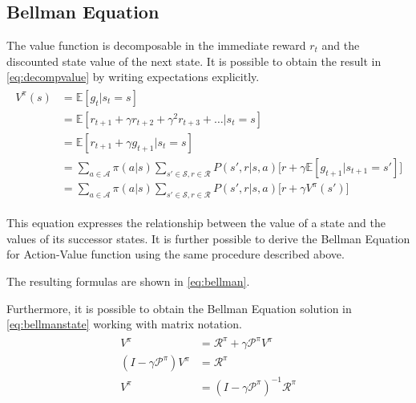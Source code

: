 \appendix

\chapter{}
\section{Bellman Equation} \label{appendix:bellmaneq}


The value function is decomposable in the immediate reward $r_t$ and the discounted state value of the next state. It is possible to obtain the result in \vref{eq:decompvalue} by writing expectations explicitly.
\begin{align}\label{eq:decompvalue}
\begin{split}
V^\pi(s) &= \mathbb{E}[g_t | s_t = s] \\
&= \mathbb{E}[r_{t+1} + \gamma r_{t+2} + \gamma^2 r_{t+3} + \dots | s_t = s] \\
&= \mathbb{E}[r_{t+1} + \gamma g_{t+1} | s_t = s] \\
&= \sum_{a \in \mathcal{A}}\pi(a|s)\sum_{s' \in \mathcal{S}, r \in \mathcal{R}}P(s', r | s, a)\big[r + \gamma\mathbb{E}[g_{t+1}| s_{t+1} = s']\big]\\
&= \sum_{a \in \mathcal{A}}\pi(a|s)\sum_{s' \in \mathcal{S}, r \in \mathcal{R}}P(s', r | s, a)\big[r + \gamma V^\pi(s')\big]
\end{split}
\end{align}

This equation expresses the relationship between the value of a state and the values of its successor states. It is further possible to derive the Bellman Equation for Action-Value function using the same procedure described above.

The resulting formulas are shown in \vref{eq:bellman}.

Furthermore, it is possible to obtain the Bellman Equation solution in \vref{eq:bellmanstate} working with matrix notation.
\begin{align} \label{eq:bellmanstate}
\begin{split}
V^\pi &= \mathcal{R}^\pi + \gamma \mathcal{P}^\pi V^\pi \\
(I - \gamma\mathcal{P}^\pi)V^\pi &= \mathcal{R}^\pi \\
V^\pi &= (I - \gamma\mathcal{P}^\pi)^{-1}\mathcal{R}^\pi
\end{split}
\end{align}